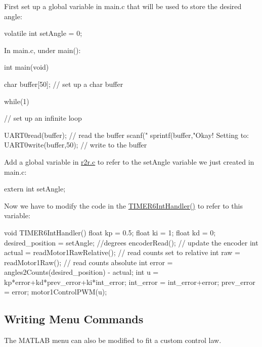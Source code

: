 First set up a global variable in {\ttfamily main.\+c} that will be used to store the desired angle\+: \begin{DoxyVerb}volatile int setAngle = 0;
\end{DoxyVerb}


In {\ttfamily main.\+c}, under {\ttfamily main()}\+: \begin{DoxyVerb}    int main(void){
    char buffer[50]; // set up a char buffer

    while(1){ // set up an infinite loop

        UART0read(buffer); // read the buffer
        scanf("%
        sprintf(buffer,"Okay! Setting to: %
        UART0write(buffer,50); // write to the buffer

    }   
}
\end{DoxyVerb}


Add a global variable in {\ttfamily \mbox{\hyperlink{r2r_8c}{r2r.\+c}}} to refer to the set\+Angle variable we just created in main.\+c\+: \begin{DoxyVerb}    extern int setAngle;
\end{DoxyVerb}


Now we have to modify the code in the {\ttfamily \mbox{\hyperlink{r2r_8c_a57b21594b75d4b2a140a1f9bbb1465e8}{T\+I\+M\+E\+R6\+Int\+Handler()}}} to refer to this variable\+: \begin{DoxyVerb}void TIMER6IntHandler(){
    float kp = 0.5;
    float ki = 1;
    float kd = 0;
    desired_position = setAngle; //degrees
    encoderRead(); // update the encoder
    int actual = readMotor1RawRelative(); // read counts set to relative
    int raw = readMotor1Raw(); // read counts absolute
    int error = angles2Counts(desired_position) - actual;
    int u = kp*error+kd*prev_error+ki*int_error;
     int_error = int_error+error;
     prev_error = error;
    motor1ControlPWM(u);
 }  
\end{DoxyVerb}
\hypertarget{index_menu}{}\subsection{Writing Menu Commands}\label{index_menu}
The M\+A\+T\+L\+AB menu can also be modified to fit a custom control law. 